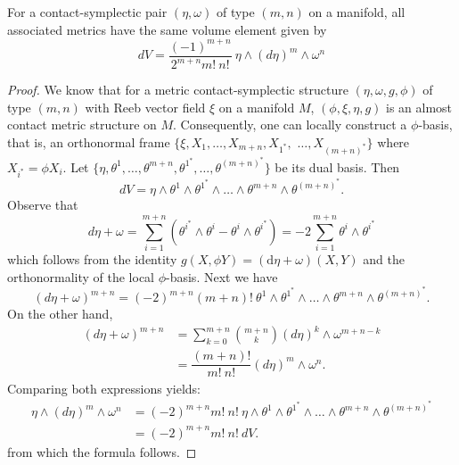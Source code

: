 \documentclass[10pt,a4paper]{amsart}
\begin{document}
\begin{theorem}\label{theoremdV}
For a contact-symplectic pair $(\eta, \omega)$ of type $(m,n)$ on a manifold, all associated metrics have the same volume element given by
\begin{equation*}
dV= \dfrac{(-1)^{m+n}}{2^{m+n} m! \ n!}\ \eta\wedge (d\eta)^{m}\wedge\omega^{n}
\end{equation*}
\end{theorem}

\begin{proof}
We know that for a metric contact-symplectic structure $(\eta, \omega, g, \phi)$ of type $(m,n)$ with Reeb vector field $\xi$ on a manifold $M$, $(\phi, \xi, \eta, g)$ is an almost contact metric structure on $M$.
Consequently, one can locally construct a $\phi$-basis, that is, an orthonormal frame $\{ \xi, X_1, \dots , X_{m+n},  X_{1^*},$ $\dots , X_{(m+n)^*}\}$ where $X_{i^*}=\phi X_i$.
Let $\{ \eta, \theta^1, \dots , \theta^{m+n}, \theta^{1^*}, \dots , \theta^{(m+n)^*}\}$ be its dual basis. 
Then
\begin{equation*}
dV= \eta \wedge \theta^1 \wedge  \theta^{1^*} \wedge  \dots \wedge \theta^{m+n} \wedge \theta^{(m+n)^*}.
\end{equation*}
Observe that
\begin{equation*}
d\eta+\omega =\sum_{i=1}^{m+n} (\theta^{i^*} \wedge \theta^i-\theta^i \wedge  \theta^{i^*})=-2\sum_{i=1}^{m+n}\theta^i \wedge  \theta^{i^*}
\end{equation*}
which follows from the identity $g(X, \phi Y) = (\mathrm{d}\eta + \omega)(X, Y)$ and the orthonormality of the local $\phi$-basis. 
Next we have
\begin{equation*}
(d\eta+\omega )^{m+n}=(-2)^{m+n} (m+n)! \ \theta^1 \wedge  \theta^{1^*} \wedge  \dots \wedge \theta^{m+n} \wedge \theta^{(m+n)^*}.
\end{equation*}
On the other hand,
\begin{align*}
(d\eta+\omega )^{m+n}&=\sum_{k=0}^{m+n} \binom{m+n}{k} (d\eta)^k \wedge \omega^{m+n-k} \\
				   &= \dfrac{(m+n)!}{m!\ n!}(d\eta)^m \wedge \omega^n .
\end{align*}
Comparing both expressions yields:
\begin{align*}
\eta\wedge(d\eta)^m \wedge \omega^n&=(-2)^{m+n} m!\ n! \ \eta \wedge \theta^1 \wedge  \theta^{1^*} \wedge  \dots \wedge \theta^{m+n} \wedge \theta^{(m+n)^*}\\
								&=(-2)^{m+n} m!\ n!  \ dV .
\end{align*}
from which the formula follows.
\end{proof}
\end{document}
